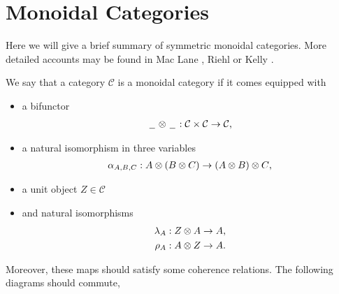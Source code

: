 \documentclass[../thesis.tex]{subfiles}
\begin{document}
    \section{Monoidal Categories}

        Here we will give a brief summary of symmetric monoidal categories. More detailed accounts may be found in Mac Lane \cite{MacLane71}, Riehl \cite{Riehl14} or Kelly \cite{Kelly05}. 

        \begin{definition}
            
            We say that a category $\mathcal{C}$ is a monoidal category if it comes equipped with 
            \begin{itemize}
                \item a bifunctor
                \begin{align*}
                    \argument \otimes \argument : \mathcal{C} \times \mathcal{C} \rightarrow \mathcal{C}\tt{,}
                \end{align*}
                \item a natural isomorphism in three variables
                \begin{align*}
                    \alpha_{A,B,C} : A \otimes (B \otimes C) \rightarrow (A \otimes B) \otimes C\tt{,}
                \end{align*}
                \item a unit object $Z \in \mathcal{C}$
                \item and natural isomorphisms
                \begin{align*}
                    \lambda_A & : Z \otimes A \rightarrow A\tt{,} \\
                    \rho_A & : A \otimes Z \rightarrow A\tt{.}
                \end{align*}
            \end{itemize}
            Moreover, these maps should satisfy some coherence relations. The following diagrams should commute,
            \begin{center}
\end{center}
\end{definition}
\end{document}
